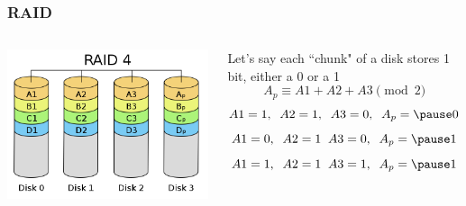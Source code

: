\documentclass{beamer}
\theoremstyle{mystyle}
\begin{document}
\begin{frame}
\frametitle{RAID}

\begin{columns}
		\begin{center}
			\vspace{-1in}
			\includegraphics[scale=0.15]{raid4}	
		\end{center}
		\begin{center}
		Let's say each ``chunk" of a disk stores 1 bit, either a 0 or a 1
		\pause
		\[A_p \equiv A1 + A2 + A3 \pmod 2\]
		\pause \[ A1 = 1, \; \; A2 = 1, \; \; A3 = 0, \;\;  A_p = \pause 0\]
		\pause \[ A1 = 0, \; \; A2 = 1 \;\; A3 = 0, \;\; A_p = \pause 1\]
		\pause \[ A1 = 1, \;\; A2 = 1 \;\; A3 = 1, \;\; A_p = \pause 1\]
		\end{center}
\end{columns}

\end{frame}

\end{document}
